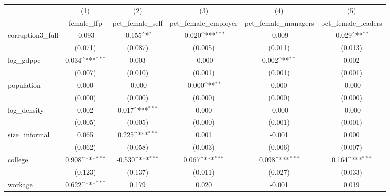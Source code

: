 {
\def\sym#1{\ifmmode^{#1}\else\(^{#1}\)\fi}
\begin{tabular}{l*{5}{c}}
\hline\hline
            &\multicolumn{1}{c}{(1)}&\multicolumn{1}{c}{(2)}&\multicolumn{1}{c}{(3)}&\multicolumn{1}{c}{(4)}&\multicolumn{1}{c}{(5)}\\
            &\multicolumn{1}{c}{female\_lfp}&\multicolumn{1}{c}{pct\_female\_self}&\multicolumn{1}{c}{pct\_female\_employer}&\multicolumn{1}{c}{pct\_female\_managers}&\multicolumn{1}{c}{pct\_female\_leaders}\\
\hline
corruption3\_full&      -0.093         &      -0.155\sym{*}  &      -0.020\sym{***}&      -0.009         &      -0.029\sym{**} \\
            &     (0.071)         &     (0.087)         &     (0.005)         &     (0.011)         &     (0.013)         \\
[1em]
log\_gdppc   &       0.034\sym{***}&       0.003         &      -0.000         &       0.002\sym{**} &       0.002         \\
            &     (0.007)         &     (0.010)         &     (0.001)         &     (0.001)         &     (0.001)         \\
[1em]
population  &       0.000         &      -0.000         &      -0.000\sym{**} &       0.000         &      -0.000         \\
            &     (0.000)         &     (0.000)         &     (0.000)         &     (0.000)         &     (0.000)         \\
[1em]
log\_density &       0.002         &       0.017\sym{***}&       0.000         &      -0.000         &      -0.000         \\
            &     (0.005)         &     (0.005)         &     (0.000)         &     (0.001)         &     (0.001)         \\
[1em]
size\_informal&       0.065         &       0.225\sym{***}&       0.001         &      -0.001         &       0.000         \\
            &     (0.062)         &     (0.058)         &     (0.003)         &     (0.006)         &     (0.007)         \\
[1em]
college     &       0.908\sym{***}&      -0.530\sym{***}&       0.067\sym{***}&       0.098\sym{***}&       0.164\sym{***}\\
            &     (0.123)         &     (0.137)         &     (0.011)         &     (0.027)         &     (0.033)         \\
[1em]
workage     &       0.622\sym{***}&       0.179         &       0.020         &      -0.001         &       0.019         \\

\end{tabular}}
